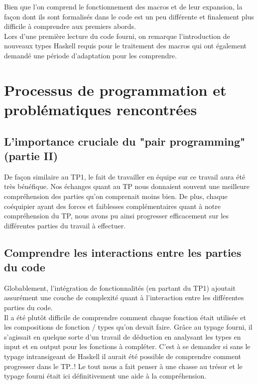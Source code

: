 \documentclass[11pt, letterpaper]{article}
\begin{document}
 Bien que l'on comprend le fonctionnement des macros et de leur expansion, la façon dont ils sont formalisés dans le code est un peu différente et finalement plus difficile à comprendre aux premiers abords. \\
 
 Lors d'une première lecture du code fourni, on remarque l'introduction de nouveaux types Haskell requis pour le traitement des macros qui ont également demandé une période d'adaptation pour les comprendre.\\
 
 \section{Processus de programmation et problématiques rencontrées}
 
 \subsection{L'importance cruciale du "pair programming" (partie II)} 
 De façon similaire au TP1, le fait de travailler en équipe sur ce travail aura été très bénéfique. Nos échanges quant au TP nous donnaient souvent une meilleure compréhension des parties qu'on comprenait moins bien. De plus, chaque coéquipier ayant des forces et faiblesses complémentaires quant à notre compréhension du TP, nous avons pu ainsi progresser efficacement sur les différentes parties du travail à effectuer.
 
 \subsection{Comprendre les interactions entre les parties du code} 
 Globablement, l'intégration de fonctionnalités (en partant du TP1) ajoutait assurément une couche de complexité quant à l'interaction entre les différentes parties du code.\\
 
 Il a été plutôt difficile de comprendre comment chaque fonction était utilisée et les compositions de fonction / types qu'on devait faire. Grâce au typage fourni, il s'agissait en quelque sorte d'un travail de déduction en analysant les types en input et en output pour les fonctions à compléter. C'est à se demander si sans le typage intransigeant de Haskell il aurait été possible de comprendre comment progresser dans le TP..! Le tout nous a fait penser à une chasse au trésor et le typage fourni était ici définitivement une aide à la compréhension.
 
\end{document}
